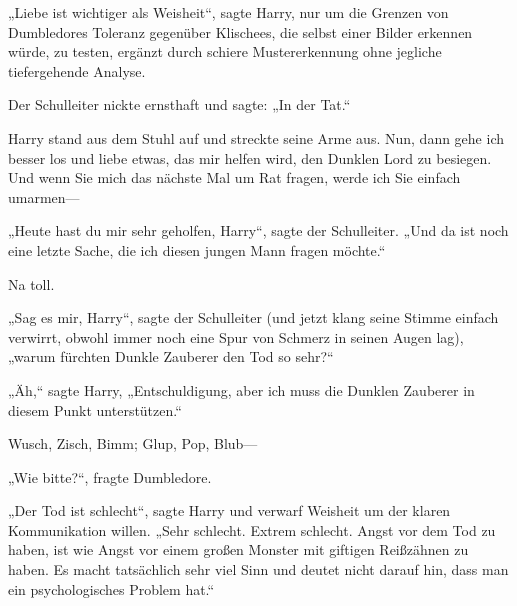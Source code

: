 „Liebe ist wichtiger als Weisheit“, sagte Harry, nur um die Grenzen von Dumbledores Toleranz gegenüber Klischees, die selbst einer Bilder erkennen würde, zu testen, ergänzt durch schiere Mustererkennung ohne jegliche tiefergehende Analyse.

Der Schulleiter nickte ernsthaft und sagte: „In der Tat.“

Harry stand aus dem Stuhl auf und streckte seine Arme aus. Nun, dann gehe ich besser los und liebe etwas, das mir helfen wird, den Dunklen Lord zu besiegen. Und wenn Sie mich das nächste Mal um Rat fragen, werde ich Sie einfach umarmen—

„Heute hast du mir sehr geholfen, Harry“, sagte der Schulleiter. „Und da ist noch eine letzte Sache, die ich diesen jungen Mann fragen möchte.“

Na toll.

„Sag es mir, Harry“, sagte der Schulleiter (und jetzt klang seine Stimme einfach verwirrt, obwohl immer noch eine Spur von Schmerz in seinen Augen lag), „warum fürchten Dunkle Zauberer den Tod so sehr?“

„Äh,“ sagte Harry, „Entschuldigung, aber ich muss die Dunklen Zauberer in diesem Punkt unterstützen.“

\later

Wusch, Zisch, Bimm; Glup, Pop, Blub—

„Wie bitte?“, fragte Dumbledore.

„Der Tod ist schlecht“, sagte Harry und verwarf Weisheit um der klaren Kommunikation willen. „Sehr schlecht. Extrem schlecht. Angst vor dem Tod zu haben, ist wie Angst vor einem großen Monster mit giftigen Reißzähnen zu haben. Es macht tatsächlich sehr viel Sinn und deutet nicht darauf hin, dass man ein psychologisches Problem hat.“

